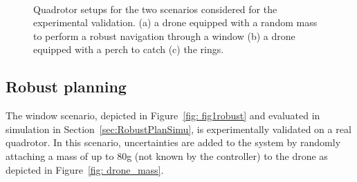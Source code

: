 \begin{figure} [htp]
    \centering
    
     \\%
    \caption{Quadrotor setups for the two scenarios considered for the experimental validation. (a) a drone equipped with a random mass to perform a robust navigation through a window (b) a drone equipped with a perch to catch (c) the rings.}%
    \label{fig: exp setup}%
\end{figure}

\subsection{Robust planning} \label{sec:RobustPlanExp}

The window scenario, depicted in Figure~\ref{fig: fig1robust} and evaluated in simulation in Section~\ref{sec:RobustPlanSimu}, is experimentally validated on a real quadrotor.
In this scenario, uncertainties are added to the system by randomly attaching a mass of up to 80g (not known by the controller) to the drone as depicted in Figure~\ref{fig: drone_mass}.

